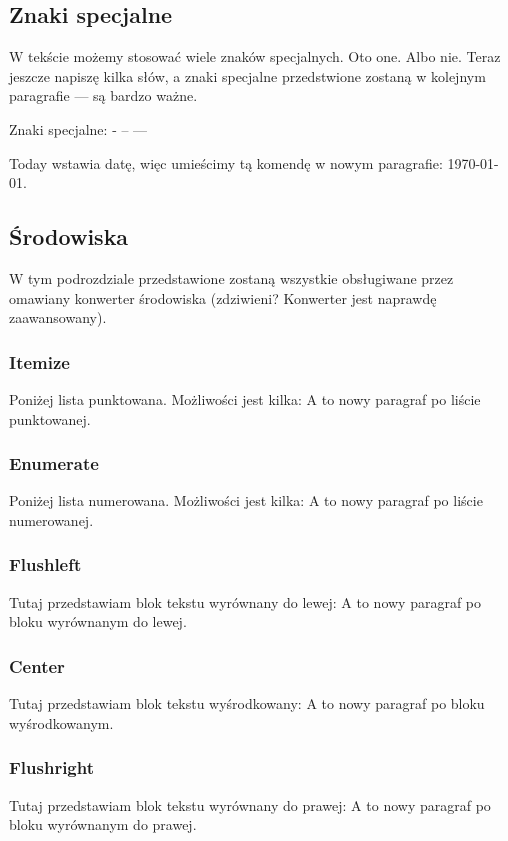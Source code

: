 \documentclass{article}
\begin{document}
    \subsection{Znaki specjalne}
    W tekście możemy stosować wiele znaków specjalnych. Oto one. Albo nie. Teraz jeszcze napiszę kilka słów, a znaki specjalne przedstwione zostaną w kolejnym paragrafie --- są bardzo ważne.\par
    Znaki specjalne: - -- ---  \par
    Today wstawia datę, więc umieścimy tą komendę w nowym paragrafie: \today.

    \subsection{Środowiska}
    W tym podrozdziale przedstawione zostaną wszystkie obsługiwane przez omawiany konwerter środowiska (zdziwieni? Konwerter jest naprawdę zaawansowany).

    \subsubsection{Itemize}
    Poniżej lista punktowana. Możliwości jest kilka:
    A to nowy paragraf po liście punktowanej.

    \subsubsection{Enumerate}
    Poniżej lista numerowana. Możliwości jest kilka:
    A to nowy paragraf po liście numerowanej.

    \subsubsection{Flushleft}
    Tutaj przedstawiam blok tekstu wyrównany do lewej:
    A to nowy paragraf po bloku wyrównanym do lewej.

    \subsubsection{Center}
    Tutaj przedstawiam blok tekstu wyśrodkowany:
    A to nowy paragraf po bloku wyśrodkowanym.

    \subsubsection{Flushright}
    Tutaj przedstawiam blok tekstu wyrównany do prawej:
    A to nowy paragraf po bloku wyrównanym do prawej.
\end{document}
